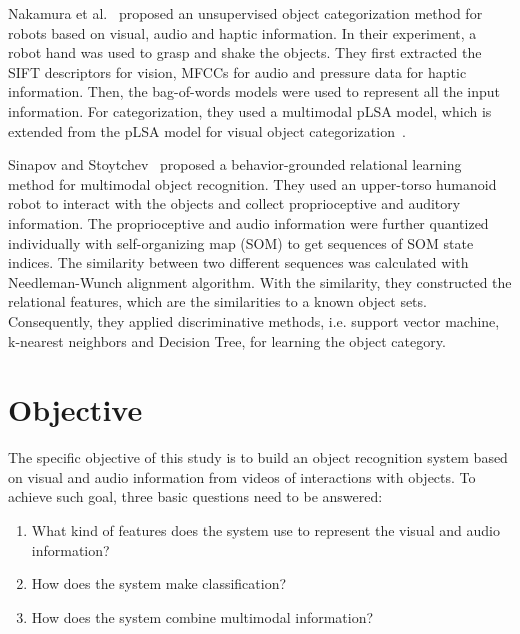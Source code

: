 \documentclass[12pt,final,twoside]{report}
\begin{document}
Nakamura et al.~\cite{nakamura_multimodal_2007} proposed an unsupervised object categorization method for robots based on visual, audio and haptic information. In their experiment, a robot hand was used to grasp and shake the objects. They first extracted the SIFT descriptors for vision, MFCCs for audio and pressure data for haptic information. Then, the bag-of-words models were used to represent all the input information. For categorization, they used a multimodal pLSA model, which is extended from the pLSA model for visual object categorization~\cite{sivic_discovering_2005}.

Sinapov and Stoytchev~\cite{sinapov_object_2011} proposed a behavior-grounded relational learning method for multimodal object recognition. They used an upper-torso humanoid robot to interact with the objects and collect proprioceptive and auditory information. The proprioceptive and audio information were further quantized individually with self-organizing map (SOM) to get sequences of SOM state indices. The similarity between two different sequences was calculated with Needleman-Wunch alignment algorithm. With the similarity, they constructed the relational features, which are the similarities to a known object sets. Consequently, they applied discriminative methods, i.e. support vector machine, k-nearest neighbors and Decision Tree, for learning the object category.


\section{Objective}
The specific objective of this study is to build an object recognition system based on visual and audio information from videos of interactions with objects. To achieve such goal, three basic questions need to be answered:
\begin{enumerate}
  \item What kind of features does the system use to represent the visual and audio information?
  \item How does the system make classification?
  \item How does the system combine multimodal information? 
\end{enumerate}
\end{document}

